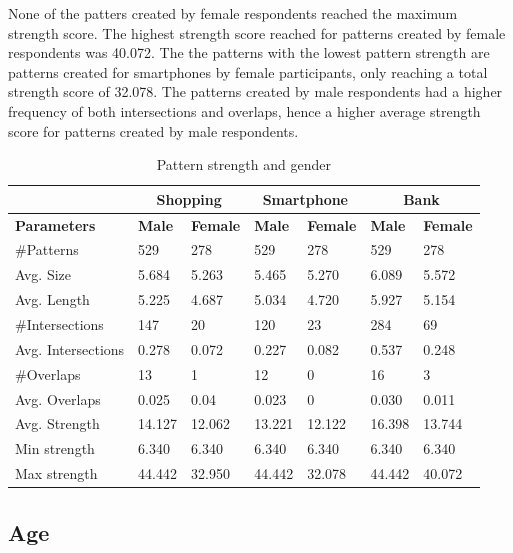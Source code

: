     None of the patters created by female respondents reached the maximum strength score. The highest strength score reached for patterns created by female respondents was 40.072. The the patterns with the lowest pattern strength are patterns created for smartphones by female participants, only reaching a total strength score of 32.078. The patterns created by male respondents had a higher frequency of both intersections and overlaps, hence a higher average strength score for patterns created by male respondents. 

    \begin{table}[H]
      \centering
      \begin{tabular}{l || l | l || l | l || l | l }
        \hline
         & \multicolumn{2}{c||}{\bf Shopping} & \multicolumn{2}{c||}{\bf Smartphone} &\multicolumn{2}{c}{\bf Bank} \\ \hline
        {\bf Parameters}   & {\bf Male} & {\bf Female} & {\bf Male} & {\bf Female} & {\bf Male} & {\bf Female}\\ \hline
        \#Patterns         & 529    & 278    & 529    & 278    & 529    & 278    \\
        Avg. Size          & 5.684  & 5.263  & 5.465  & 5.270  & 6.089  & 5.572  \\
        Avg. Length        & 5.225  & 4.687  & 5.034  & 4.720  & 5.927  & 5.154  \\
        \#Intersections    & 147    & 20     & 120    & 23     & 284    & 69     \\
        Avg. Intersections & 0.278  & 0.072  & 0.227  & 0.082  & 0.537  & 0.248  \\
        \#Overlaps         & 13     & 1      & 12     & 0      & 16     & 3      \\
        Avg. Overlaps      & 0.025  & 0.04   & 0.023  & 0      & 0.030  & 0.011  \\ \hline
        Avg. Strength      & 14.127 & 12.062 & 13.221 & 12.122 & 16.398 & 13.744 \\ 
        Min strength       & 6.340  & 6.340  & 6.340  & 6.340  & 6.340  & 6.340  \\
        Max strength       & 44.442 & 32.950  & 44.442 & 32.078 & 44.442 & 40.072 \\ \hline
      \end{tabular}
      \caption{Pattern strength and gender}
      \label{tab:gendertrength}
    \end{table}

	\subsection{Age}

